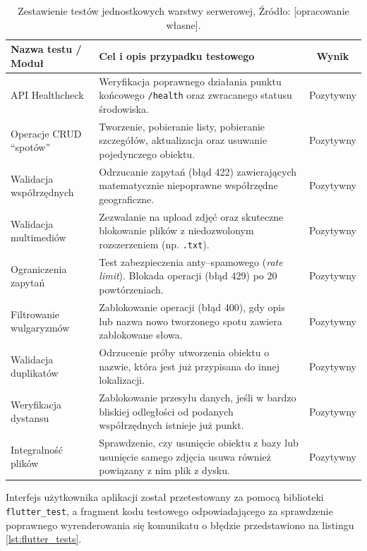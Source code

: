                 \begin{table}[!ht] \centering
    \caption{Zestawienie testów jednostkowych warstwy serwerowej, Źródło: [opracowanie własne].}
    \label{tab:pytest_cases}
    \begin{tabularx}{\textwidth}{ | l | X | c | } \hline
        \textbf{Nazwa testu / Moduł} & \textbf{Cel i opis przypadku testowego} & \textbf{Wynik} \\ \hline
        API Healthcheck & Weryfikacja poprawnego działania punktu końcowego \texttt{/health} oraz zwracanego statusu środowiska. & Pozytywny \\ \hline
        Operacje CRUD \enquote{spotów} & Tworzenie, pobieranie listy, pobieranie szczegółów, aktualizacja oraz usuwanie pojedynczego obiektu. & Pozytywny \\ \hline
        Walidacja współrzędnych & Odrzucanie zapytań (błąd 422) zawierających matematycznie niepoprawne współrzędne geograficzne. & Pozytywny \\ \hline
        Walidacja multimediów & Zezwalanie na upload zdjęć oraz skuteczne blokowanie plików z niedozwolonym rozszerzeniem (np. \texttt{.txt}). & Pozytywny \\ \hline
        Ograniczenia zapytań & Test zabezpieczenia anty–spamowego (\textit{rate limit}). Blokada operacji (błąd 429) po 20 powtórzeniach. & Pozytywny \\ \hline
        Filtrowanie wulgaryzmów & Zablokowanie operacji (błąd 400), gdy opis lub nazwa nowo tworzonego spotu zawiera zablokowane słowa. & Pozytywny \\ \hline
        Walidacja duplikatów & Odrzucenie próby utworzenia obiektu o nazwie, która jest już przypisana do innej lokalizacji. & Pozytywny \\ \hline
        Weryfikacja dystansu & Zablokowanie przesyłu danych, jeśli w bardzo bliskiej odległości od podanych współrzędnych istnieje już punkt. & Pozytywny \\ \hline
        Integralność plików & Sprawdzenie, czy usunięcie obiektu z bazy lub usunięcie samego zdjęcia usuwa również powiązany z nim plik z dysku. & Pozytywny \\ \hline
    \end{tabularx}
\end{table}

Interfejs użytkownika aplikacji został przetestowany za pomocą biblioteki \texttt{flutter\_test}, a fragment kodu testowego odpowiadającego za sprawdzenie poprawnego wyrenderowania się komunikatu o błędzie przedstawiono na listingu \ref{lst:flutter_tests}.

